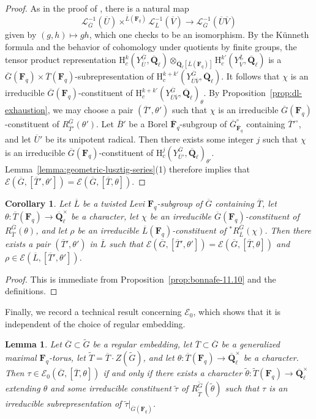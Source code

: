 \documentclass[reqno]{amsart}
\numberwithin{equation}{subsection}
\newcommand{\F}{\mathbf{F}}
\newcommand{\wt}[1]{\widetilde{#1}}
\newcommand{\Q}{\mathbf{Q}}
\newcommand{\ol}[1]{\overline{#1}}
\newcommand{\co}{\colon}
\newcommand\cE{\mathcal{E}}
\newcommand\cL{\mathcal{L}}
\newcommand{\rH}{\ensuremath{\mathrm{H}}\xspace}
\newtheorem{lemma}[thm]{Lemma}
\newtheorem{cor}[thm]{Corollary}
\theoremstyle{remark}
\numberwithin{equation}{subsection}
\numberwithin{figure}{subsection}
\begin{document}
\begin{proof}
    As in the proof of \cite[11.5]{DM20}, there is a natural map
    \[
    \cL_{\ol G}^{-1}(\ol U) \times^{\ol L(\F_q)} \cL_{\ol L}^{-1}(\ol V) \to \cL_{\ol G}^{-1}(\ol U\ol V)
    \]
    given by $(g, h) \mapsto gh$, which one checks to be an isomorphism. By the K\"unneth formula and the behavior of cohomology under quotients by finite groups, the tensor product representation $\rH_c^k(Y_{\ol U}^{\ol G}, \ol\Q_\ell) \otimes_{\ol\Q_\ell[\ol L(\F_q)]} \rH_c^{k'}(Y_{\ol V}^{\ol L}, \ol\Q_\ell)$ is a $\ol G(\F_q) \times \ol T(\F_q)$-subrepresentation of $\rH_c^{k+k'}(Y_{\ol U\ol V}^{\ol G}, \ol\Q_\ell)$. It follows that $\chi$ is an irreducible $\ol G(\F_q)$-constituent of $\rH_c^{k+k'}(Y_{\ol U\ol V}^{\ol G}, \ol\Q_\ell)_\theta$. By Proposition~\ref{prop:dl-exhaustion}, we may choose a pair $(\ol T', \theta')$ such that $\chi$ is an irreducible $\ol G(\F_q)$-constituent of $R_{\ol T'}^{\ol G}(\theta')$. Let $\ol B'$ be a Borel $\ol\F_q$-subgroup of $\ol G^\circ_{\ol\F_q}$ containing $\ol T'^\circ$, and let $\ol U'$ be its unipotent radical. Then there exists some integer $j$ such that $\chi$ is an irreducible $\ol G(\F_q)$-constituent of $\rH_c^j(Y_{\ol U'}^{\ol G}, \ol\Q_\ell)_{\theta'}$. Lemma~\ref{lemma:geometric-lusztig-series}(1) therefore implies that $\cE(\ol G, [\ol T', \theta']) = \cE(\ol G, [\ol T, \theta])$.
\end{proof}

\begin{cor}\label{cor:bonnafe-11.11}
    Let $\ol L$ be a twisted Levi $\F_q$-subgroup of $\ol G$ containing $\ol T$, let $\theta\co \ol T(\F_q) \to \ol\Q_\ell^\times$ be a character, let $\chi$ be an irreducible $\ol G(\F_q)$-constituent of $R_{\ol T}^{\ol G}(\theta)$, and let $\rho$ be an irreducible $\ol L(\F_q)$-constituent of ${}^*R^{\ol G}_{\ol L}(\chi)$. Then there exists a pair $(\ol T', \theta')$ in $\ol L$ such that $\cE(\ol G, [\ol T', \theta']) = \cE(\ol G, [\ol T, \theta])$ and $\rho \in \cE(\ol L, [\ol T', \theta'])$.
\end{cor}

\begin{proof}
    This is immediate from Proposition~\ref{prop:bonnafe-11.10} and the definitions. 
\end{proof}

Finally, we record a technical result concerning $\cE_0$, which shows that it is independent of the choice of regular embedding.

\begin{lemma}\label{lemma:E_0-independence-of-regular-embedding}
    Let $\ol G \subset \wt G$ be a regular embedding, let $\ol T \subset \ol G$ be a generalized maximal $\F_q$-torus, let $\wt T = \ol T \cdot Z(\wt G)$, and let $\theta\co \ol T(\F_q) \to \ol\Q_\ell^\times$ be a character. Then $\tau \in \cE_0(\ol G, [\ol T, \theta])$ if and only if there exists a character $\wt\theta\co \wt T(\F_q) \to \ol\Q_\ell^\times$ extending $\theta$ and some irreducible constituent $\wt\tau$ of $R_{\wt T}^{\wt G}(\wt\theta)$ such that $\tau$ is an irreducible subrepresentation of $\wt\tau|_{\ol G(\F_q)}$.
\end{lemma}
\end{document}
